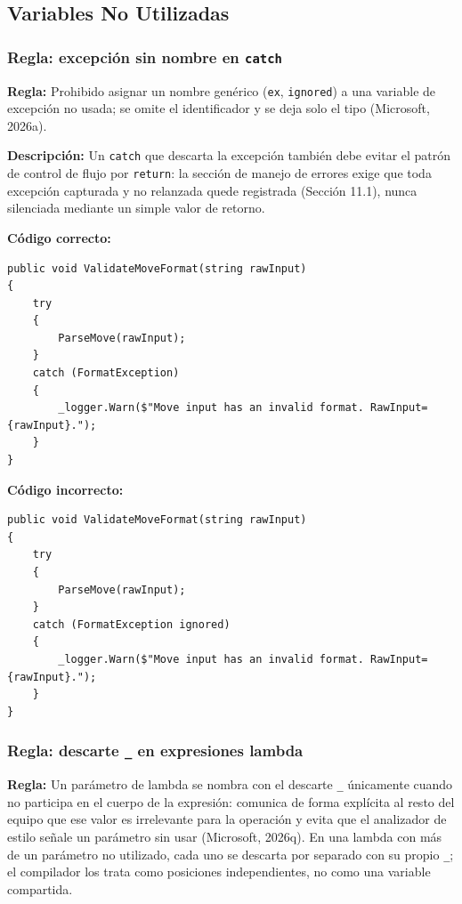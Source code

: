 \subsection{Variables No Utilizadas}

\subsubsection{Regla: excepción sin nombre en \texttt{catch}}

\textbf{Regla:} Prohibido asignar un nombre genérico (\texttt{ex}, \texttt{ignored}) a una variable de excepción no usada; se omite el identificador y se deja solo el tipo (Microsoft, 2026a).

\textbf{Descripción:} Un \texttt{catch} que descarta la excepción también debe evitar el patrón de control de flujo por \texttt{return}: la sección de manejo de errores exige que toda excepción capturada y no relanzada quede registrada (Sección 11.1), nunca silenciada mediante un simple valor de retorno.

\textbf{Código correcto:}
\begin{lstlisting}[style=csharpstyle]
public void ValidateMoveFormat(string rawInput)
{
    try
    {
        ParseMove(rawInput);
    }
    catch (FormatException)
    {
        _logger.Warn($"Move input has an invalid format. RawInput={rawInput}.");
    }
}
\end{lstlisting}

\textbf{Código incorrecto:}
\begin{lstlisting}[style=csharpstyle]
public void ValidateMoveFormat(string rawInput)
{
    try
    {
        ParseMove(rawInput);
    }
    catch (FormatException ignored)
    {
        _logger.Warn($"Move input has an invalid format. RawInput={rawInput}.");
    }
}
\end{lstlisting}

\subsubsection{Regla: descarte \texttt{\_} en expresiones lambda}

\textbf{Regla:} Un parámetro de lambda se nombra con el descarte \texttt{\_} únicamente cuando no participa en el cuerpo de la expresión: comunica de forma explícita al resto del equipo que ese valor es irrelevante para la operación y evita que el analizador de estilo señale un parámetro sin usar (Microsoft, 2026q). En una lambda con más de un parámetro no utilizado, cada uno se descarta por separado con su propio \texttt{\_}; el compilador los trata como posiciones independientes, no como una variable compartida.

